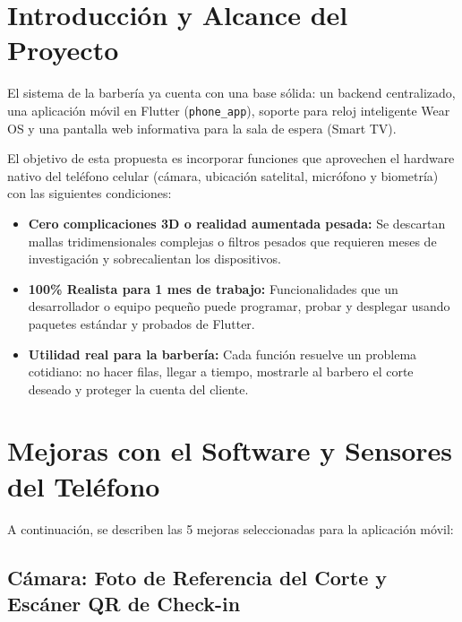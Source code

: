 \documentclass[11pt,a4paper]{article}
\begin{document}
\newpage
\tableofcontents
\newpage

\section{Introducción y Alcance del Proyecto}

El sistema de la barbería ya cuenta con una base sólida: un backend centralizado, una aplicación móvil en Flutter (\texttt{phone\_app}), soporte para reloj inteligente Wear OS y una pantalla web informativa para la sala de espera (Smart TV).

El objetivo de esta propuesta es incorporar funciones que aprovechen el hardware nativo del teléfono celular (cámara, ubicación satelital, micrófono y biometría) con las siguientes condiciones:
\begin{itemize}
    \item \textbf{Cero complicaciones 3D o realidad aumentada pesada:} Se descartan mallas tridimensionales complejas o filtros pesados que requieren meses de investigación y sobrecalientan los dispositivos.
    \item \textbf{100\% Realista para 1 mes de trabajo:} Funcionalidades que un desarrollador o equipo pequeño puede programar, probar y desplegar usando paquetes estándar y probados de Flutter.
    \item \textbf{Utilidad real para la barbería:} Cada función resuelve un problema cotidiano: no hacer filas, llegar a tiempo, mostrarle al barbero el corte deseado y proteger la cuenta del cliente.
\end{itemize}

\section{Mejoras con el Software y Sensores del Teléfono}

A continuación, se describen las 5 mejoras seleccionadas para la aplicación móvil:

\subsection{Cámara: Foto de Referencia del Corte y Escáner QR de Check-in}
\end{document}

